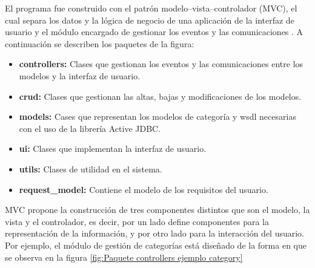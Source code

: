 El programa fue construido con el patrón modelo–vista–controlador (MVC), el cual separa los datos y la lógica de negocio de una aplicación de la interfaz de usuario y el módulo encargado de gestionar los eventos y las comunicaciones . A continuación se describen los paquetes de la figura:

\begin{itemize}
	\item \textbf{controllers:} Clases que gestionan los eventos y las comunicaciones entre los modelos y la interfaz de usuario.
	\item \textbf{crud:} Clases que gestionan las altas, bajas y modificaciones de los modelos.
	\item \textbf{models:} Cases que representan los modelos de categoría y wsdl necesarias con el uso de la librería Active JDBC. 
	\item \textbf{ui:} Clases que implementan la interfaz de usuario.
	\item \textbf{utils:} Clases de utilidad en el sistema.
	\item \textbf{request\_model:} Contiene el modelo de los requisitos del usuario.
\end{itemize}

MVC propone la construcción de tres componentes distintos que son el modelo, la vista y el controlador, es decir, por un lado define componentes para la representación de la información, y por otro lado para la interacción del usuario. Por ejemplo, el módulo de gestión de categorías está diseñado de la forma en que se observa en la figura \ref{fig:Paquete controllers ejemplo category}\\

